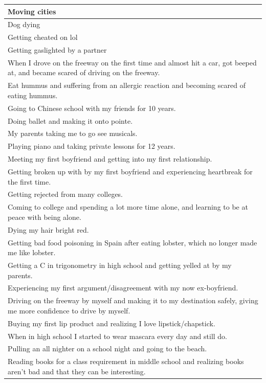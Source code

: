 \documentclass[
  .7em,
  letterpaper,
  DIV=11,
  numbers=noendperiod]{scrartcl}
\begin{document}
\begin{table}
\begin{tabular}{l}
\hline
Moving cities\\
\hline
Dog dying\\
\hline
Getting cheated on lol\\
\hline
Getting gaslighted by a partner\\
\hline
When I drove on the freeway on the first time and almost hit a car, got beeped at, and became scared of driving on the freeway.\\
\hline
Eat hummus and suffering from an allergic reaction and becoming scared of eating hummus.\\
\hline
Going to Chinese school with my friends for 10 years.\\
\hline
Doing ballet and making it onto pointe.\\
\hline
My parents taking me to go see musicals.\\
\hline
Playing piano and taking private lessons for 12 years.\\
\hline
Meeting my first boyfriend and getting into my first relationship.\\
\hline
Getting broken up with by my first boyfriend and experiencing heartbreak for the first time.\\
\hline
Getting rejected from many colleges.\\
\hline
Coming to college and spending a lot more time alone, and learning to be at peace with being alone.\\
\hline
Dying my hair bright red.\\
\hline
Getting bad food poisoning in Spain after eating lobster, which no longer made me like lobster.\\
\hline
Getting a C in trigonometry in high school and getting yelled at by my parents.\\
\hline
Experiencing my first argument/disagreement with my now ex-boyfriend.\\
\hline
Driving on the freeway by myself and making it to my destination safely, giving me more confidence to drive by myself.\\
\hline
Buying my first lip product and realizing I love lipstick/chapstick.\\
\hline
When in high school I started to wear mascara every day and still do.\\
\hline
Pulling an all nighter on a school night and going to the beach.\\
\hline
Reading books for a class requirement in middle school and realizing books aren't bad and that they can be interesting.\\

\end{tabular}
\end{table}
\end{document}
